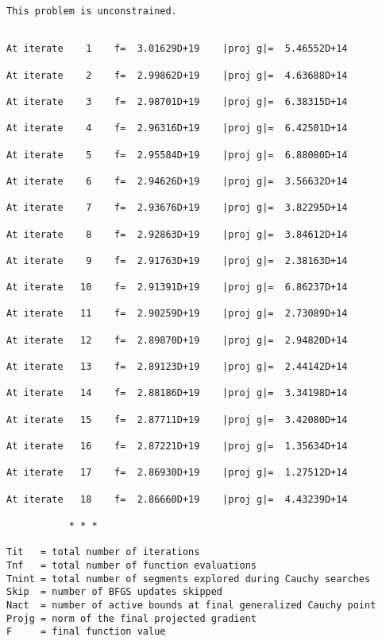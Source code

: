 \documentclass[11pt]{article}
\begin{document}
    \begin{Verbatim}[commandchars=\\\{\}]
 This problem is unconstrained.
    \end{Verbatim}

    \begin{Verbatim}[commandchars=\\\{\}]

At iterate    1    f=  3.01629D+19    |proj g|=  5.46552D+14

At iterate    2    f=  2.99862D+19    |proj g|=  4.63688D+14

At iterate    3    f=  2.98701D+19    |proj g|=  6.38315D+14

At iterate    4    f=  2.96316D+19    |proj g|=  6.42501D+14

At iterate    5    f=  2.95584D+19    |proj g|=  6.88080D+14

At iterate    6    f=  2.94626D+19    |proj g|=  3.56632D+14

At iterate    7    f=  2.93676D+19    |proj g|=  3.82295D+14

At iterate    8    f=  2.92863D+19    |proj g|=  3.84612D+14

At iterate    9    f=  2.91763D+19    |proj g|=  2.38163D+14

At iterate   10    f=  2.91391D+19    |proj g|=  6.86237D+14

At iterate   11    f=  2.90259D+19    |proj g|=  2.73089D+14

At iterate   12    f=  2.89870D+19    |proj g|=  2.94820D+14

At iterate   13    f=  2.89123D+19    |proj g|=  2.44142D+14

At iterate   14    f=  2.88186D+19    |proj g|=  3.34198D+14

At iterate   15    f=  2.87711D+19    |proj g|=  3.42080D+14

At iterate   16    f=  2.87221D+19    |proj g|=  1.35634D+14

At iterate   17    f=  2.86930D+19    |proj g|=  1.27512D+14

At iterate   18    f=  2.86660D+19    |proj g|=  4.43239D+14

           * * *

Tit   = total number of iterations
Tnf   = total number of function evaluations
Tnint = total number of segments explored during Cauchy searches
Skip  = number of BFGS updates skipped
Nact  = number of active bounds at final generalized Cauchy point
Projg = norm of the final projected gradient
F     = final function value


\end{Verbatim}
\end{document}
